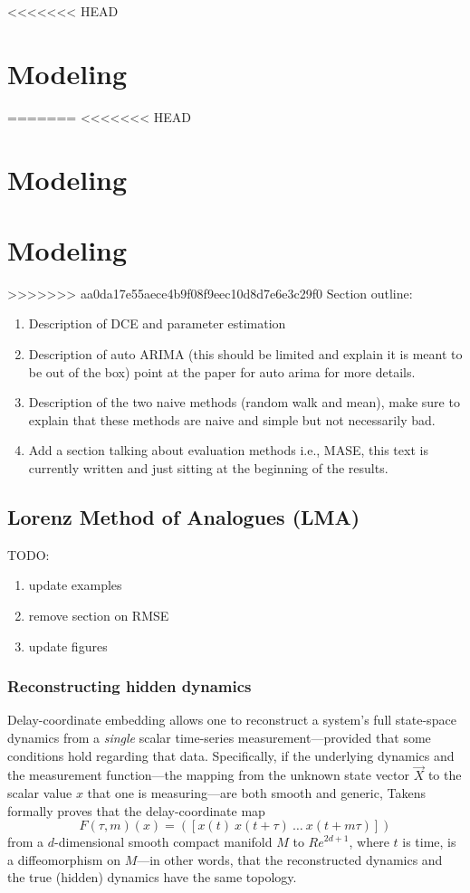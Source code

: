 <<<<<<< HEAD
\section{Modeling}\label{sec:model}
=======
<<<<<<< HEAD
\section{Modeling}
\label{sec:compModel}

\section{Modeling}

>>>>>>> aa0da17e55aece4b9f08f9eec10d8d7e6e3c29f0
Section outline:

\begin{enumerate}

\item Description of DCE and parameter estimation  
\item Description of auto ARIMA 
\subitem (this should be limited and explain it is meant to be out of the box) point at the paper for auto arima for more details.
\item Description of the two naive methods (random walk and mean), make sure to explain that these methods are naive and simple but not necessarily bad.
\item\cmark Add a section talking about evaluation methods i.e., MASE, this text is currently written and just sitting at the beginning of the results. 

\end{enumerate}

\subsection{Lorenz Method of Analogues (LMA)}
TODO:
\begin{enumerate}
\item update examples
\item remove section on RMSE
\item update figures
\end{enumerate}


 \subsubsection{Reconstructing hidden dynamics}



Delay-coordinate embedding allows one to reconstruct a system's full
state-space dynamics from a \emph{single} scalar time-series
measurement---provided that some conditions hold regarding that data.
Specifically, if the underlying dynamics and the measurement
function---the mapping from the unknown state vector $\vec{X}$ to the
scalar value $x$ that one is measuring---are both smooth and generic,
Takens~\cite{takens} formally proves that the delay-coordinate map
\[
F(\tau,m)(x) = ([x(t) ~ x(t+\tau) ~ \dots ~x(t+m\tau)])
\]
from a $d$-dimensional smooth compact manifold $M$ to ${Re}^{2d+1}$,
where $t$ is time, is a diffeomorphism on $M$---in other words, that
the reconstructed dynamics and the true (hidden) dynamics have the
same topology.

